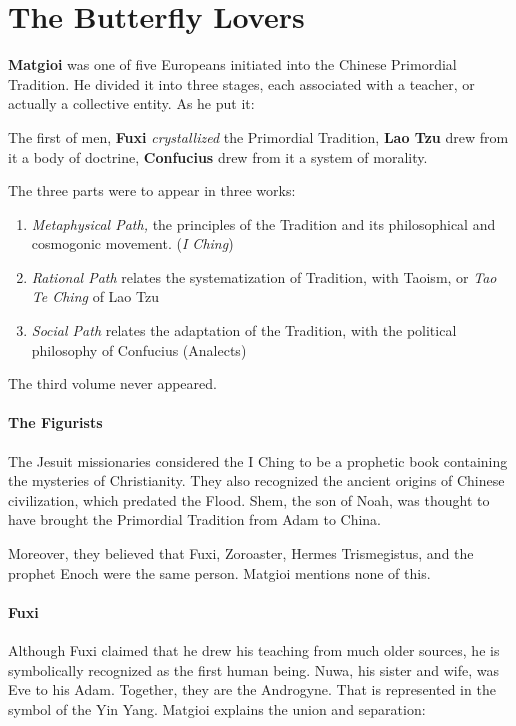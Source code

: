 \section{The Butterfly Lovers}

\textbf{Matgioi} was one of five Europeans initiated into the Chinese Primordial Tradition. He divided it into three stages, each associated with a teacher, or actually a collective entity. As he put it:

\begin{quotex}
The first of men, \textbf{Fuxi} \emph{crystallized} the Primordial Tradition, \textbf{Lao Tzu} drew from it a body of doctrine, \textbf{Confucius} drew from it a system of morality.

\end{quotex}
The three parts were to appear in three works:

\begin{enumerate}
\item \emph{Metaphysical Path,} the principles of the Tradition and its philosophical and cosmogonic movement. (\emph{I Ching}) 
\item \emph{Rational Path} relates the systematization of Tradition, with Taoism, or \emph{Tao Te Ching} of Lao Tzu 
\item \emph{Social Path} relates the adaptation of the Tradition, with the political philosophy of Confucius (Analects) 
\end{enumerate}
The third volume never appeared.

\paragraph{The Figurists}
The Jesuit missionaries considered the I Ching to be a prophetic book containing the mysteries of Christianity. They also recognized the ancient origins of Chinese civilization, which predated the Flood. Shem, the son of Noah, was thought to have brought the Primordial Tradition from Adam to China.

Moreover, they believed that Fuxi, Zoroaster, Hermes Trismegistus, and the prophet Enoch were the same person. Matgioi mentions none of this.

\paragraph{Fuxi}
Although Fuxi claimed that he drew his teaching from much older sources, he is symbolically recognized as the first human being. Nuwa, his sister and wife, was Eve to his Adam. Together, they are the Androgyne. That is represented in the symbol of the Yin Yang. Matgioi explains the union and separation:

